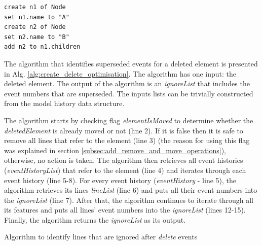 \documentclass{llncs}
\begin{document}
\begin{lstlisting}[style=eol,caption={Change-based representation of the model of Figure \ref{fig:initial_model} after removal of node \emph{n5}.},label=lst:cbpmodel_optimised]
create n1 of Node
set n1.name to "A"
create n2 of Node
set n2.name to "B"
add n2 to n1.children
\end{lstlisting}

The algorithm that identifies superseded events for a deleted element is presented in Alg. \ref{alg:create_delete_optimisation}.
The algorithm has one input: the deleted element.
The output of the algorithm is an \emph{ignoreList} that includes the event numbers that are superseded.
The inputs lists can be trivially constructed from the model history data structure.

The algorithm starts by checking flag \emph{elementIsMoved} to determine whether the \emph{deletedElement} is already moved or not (line 2).
If it is false then it is safe to remove all lines that refer to the element (line 3) (the reason for using this flag was explained in section \ref{subsec:add_remove_and_move_operations}), otherwise, no action is taken.
The algorithm then retrieves all event histories (\emph{eventHistoryList}) that refer to the element (line 4) and iterates through each event history (line 5-8).
For every event history (\emph{eventHistory} - line 5), the algorithm retrieves its lines \emph{lineList} (line 6) and puts all their event numbers into the \emph{ignoreList} (line 7).
After that, the algorithm continues to iterate through all its features and puts all lines' event numbers into the \emph{ignoreList} (lines 12-15). Finally, the algorithm returns the \emph{ignoreList} as its output.

\begin{algorithm}[H]
\begin{small}
\end{small}
\caption{Algorithm to identify lines that are ignored after \emph{delete} events}
\label{alg:create_delete_optimisation}
\end{algorithm}
\end{document}

